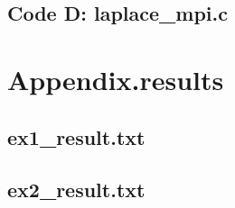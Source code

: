 \documentclass[11pt]{article}
\begin{document}
\subsection{Code D: laplace\_mpi.c}


\begin{footnotesize}

\end{footnotesize}



\section{Appendix.results}

\subsection{ex1\_result.txt}
\begin{footnotesize}
 
\end{footnotesize}

\subsection{ex2\_result.txt}
\begin{footnotesize}
 
\end{footnotesize}
\end{document}
